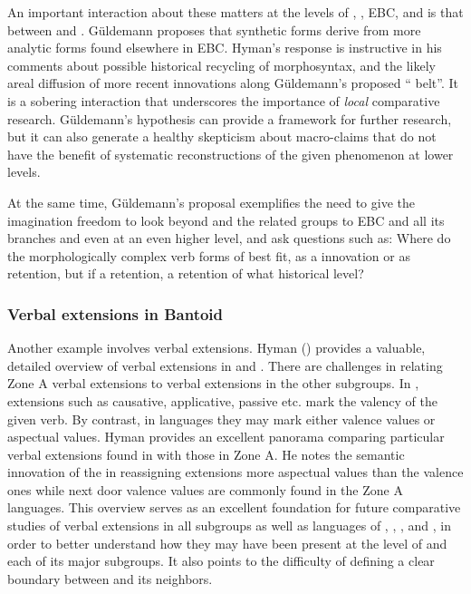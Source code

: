 \documentclass[output=paper]{langsci/langscibook}
\begin{document}
An important interaction about these matters at the levels of , , EBC, and  is that between \citet{Güldemann2011} and \citet{Hyman2011}. G\"{u}ldemann proposes that  synthetic forms derive from more analytic forms found elsewhere in EBC. Hyman’s response is instructive in his comments about possible historical recycling of morphosyntax, and the likely areal diffusion of more recent innovations along G\"{u}ldemann’s proposed “ belt”. It is a sobering interaction that underscores the importance of \textit{local} comparative research. G\"{u}ldemann’s hypothesis can provide a framework for further research, but it can also generate a healthy skepticism about macro-claims that do not have the benefit of systematic reconstructions of the given phenomenon at lower levels.

At the same time, G\"{u}ldemann’s proposal exemplifies the need to give the imagination freedom to look beyond  and the related  groups to EBC and all its branches and even  at an even  higher level, and ask questions such as: Where do the morphologically complex verb forms of  best fit, as a  innovation or as  retention, but if a retention, a retention of what historical level?   


\subsubsection{Verbal extensions in Bantoid}

Another example involves verbal extensions. Hyman () provides a valuable, detailed overview of verbal extensions in  and . There are challenges in relating  Zone A verbal extensions to verbal extensions in the other  subgroups. In , extensions such as causative, applicative, passive etc. mark the valency of the given verb. By contrast, in  languages they may mark either valence values or aspectual values. Hyman provides an excellent panorama comparing particular verbal extensions found in  with those in  Zone A. He notes the semantic innovation of the  in reassigning extensions more aspectual values than the valence ones while next door valence values are commonly found in the  Zone A languages. This overview serves as an excellent foundation for future comparative studies of verbal extensions in all  subgroups as well as languages of , , , and , in order to better understand how they may have been present at the level of  and each of its major subgroups. It also points to the difficulty of defining a clear boundary between  and its  neighbors.
\end{document}

